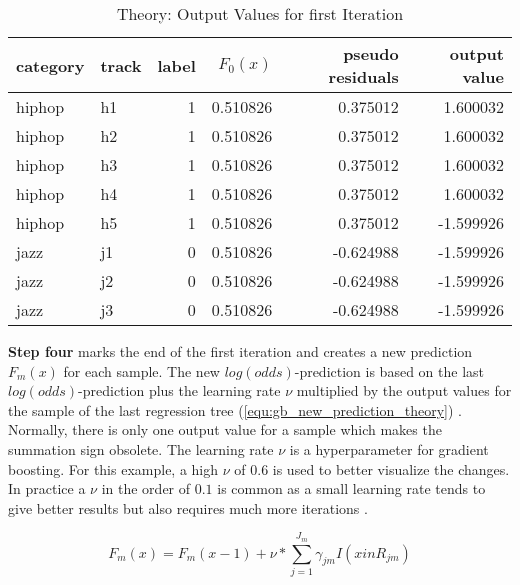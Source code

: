 \begin{table}[H]
    \centering
    \begin{tabular}{llrrrr}
        \toprule
        category & track &  label &  \(F_{0}(x)\) &  pseudo residuals &  output value \\
        \midrule
          hiphop &    h1 &      1 & 0.510826 &            0.375012 &        1.600032 \\
          hiphop &    h2 &      1 & 0.510826 &            0.375012 &        1.600032 \\
          hiphop &    h3 &      1 & 0.510826 &            0.375012 &        1.600032 \\
          hiphop &    h4 &      1 & 0.510826 &            0.375012 &        1.600032 \\
          hiphop &    h5 &      1 & 0.510826 &            0.375012 &       -1.599926 \\
            jazz &    j1 &      0 & 0.510826 &           -0.624988 &       -1.599926 \\
            jazz &    j2 &      0 & 0.510826 &           -0.624988 &       -1.599926 \\
            jazz &    j3 &      0 & 0.510826 &           -0.624988 &       -1.599926 \\
        \bottomrule
        \end{tabular}
    \caption{Theory: Output Values for first Iteration}%
    \label{tbl:theory_output_values_1_iteration}%
  \end{table} 

\textbf{Step four} marks the end of the first iteration and creates a new prediction \(F_{m}(x)\) for each sample. 
The new \(log(odds)\)-prediction is based on the last \(log(odds)\)-prediction plus the learning rate \(\nu\) multiplied by 
the output values for the sample of the last regression tree (\ref{equ:gb_new_prediction_theory}) \cite[p.1203]{Friedman_2001}. Normally, there is only one 
output value for a sample which makes the summation sign obsolete. The learning rate \(\nu\) is a 
hyperparameter for gradient boosting. For this example, a high \(\nu\) of \(0.6\) is used to better visualize 
the changes. In practice a \(\nu \) in the order of \(0.1\) is common as a small learning rate tends to
give better results but also requires much more iterations \cite[p.1206]{Friedman_2001}. 

\begin{equation}
    F_{m}(x) = F_{m}(x- 1) + \nu * \sum_{j = 1}^{J_{m}} \gamma_{jm}I(x in R_{jm})
    \label{equ:gb_new_prediction_theory}
\end{equation}

